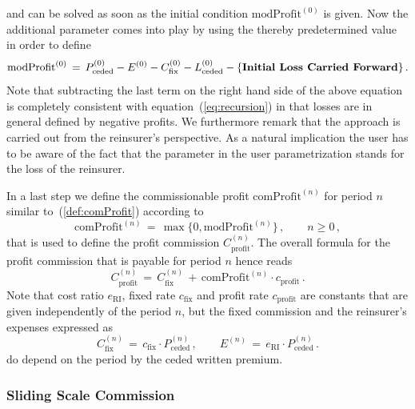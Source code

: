 and can be solved as soon as the initial condition $\mathrm{modProfit}^{(0)}$ is given. Now the additional parameter
 comes into play by using the thereby predetermined value in order to define
\[ \mathrm{modProfit}^{(0)}\,=\,
P_{\mathrm{ceded}}^{(0)}-E^{(0)}-C_{\mathrm{fix}}^{(0)}- L_{\mathrm{ceded}}^{(0)}
- \{\textbf{Initial Loss Carried Forward}\}\,.   \]
Note that subtracting the last term on the right hand side of the above equation is 
completely consistent with equation~(\ref{eq:recursion}) in that losses are in general defined by 
negative profits. We furthermore remark that the approach is carried out from 
the reinsurer's perspective. 
As a natural implication the user has to be aware of the fact that the parameter 
 in the user parametrization stands for the loss of the
reinsurer.

In a last step we define the commissionable profit $\mathrm{comProfit}^{(n)}$ for period 
$n$ similar to~(\ref{def:comProfit})
according to
\[ \mathrm{comProfit}^{(n)}\,=\,\max\big\{0,\mathrm{modProfit}^{(n)}\big\}\,,\qquad n\geq0\,,   \]
that is used to define the profit commission $C_{\mathrm{profit}}^{(n)}$. The overall formula 
for the profit commission that is payable for period $n$ hence reads 
\begin{equation}\label{eq:profitCom_n}
  C_{\mathrm{profit}}^{(n)}\,=\, C_{\mathrm{fix}}^{(n)}  \,+
  \,\mathrm{comProfit}^{(n)}\cdot c_{\mathrm{profit}}\,.
\end{equation}
Note that cost ratio $e_{\mathrm{RI}}$, fixed rate $c_{\mathrm{fix}}$ and profit rate $c_{\mathrm{profit}}$
are constants that are given independently of the period $n$, 
but the fixed commission and the reinsurer's expenses expressed as 
\[ C_{\mathrm{fix}}^{(n)}\,=\,c_{\mathrm{fix}}\cdot P_{\mathrm{ceded}}^{(n)}\,,
\qquad E^{(n)}\,=\, e_{\mathrm{RI}}\cdot P_{\mathrm{ceded}}^{(n)}\,.\]
do depend on the period by the ceded written premium.


\subsubsection{Sliding Scale Commission}
\label{subsubsec:slidingCommission}

